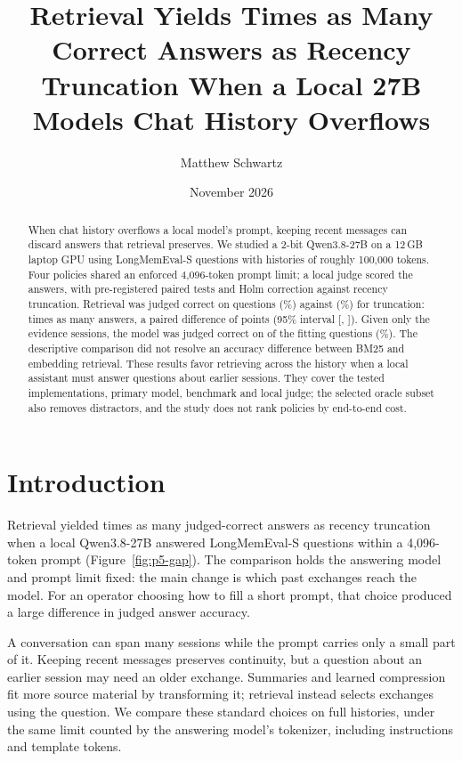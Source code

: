 \documentclass[11pt,letterpaper]{article}
\title{\textbf{Retrieval Yields \PfiveRetrievalRatio{} Times as Many Correct Answers as Recency Truncation When a Local 27B Model\textquotesingle{}s Chat History Overflows}}
\author{Matthew Schwartz\singleauthorinfo{Independent researcher \enspace
\href{https://orcid.org/0009-0009-4171-7247}{ORCID 0009-0009-4171-7247}
\enspace \texttt{matthew.schwartz.research@gmail.com}}}
\date{November 2026}
\newcommand{\PfiveLargeBudget}{4,096}
\newcommand{\PfiveHistoryTokens}{100,000}
\newcommand{\PfiveGpuMemory}{12}
\newcommand{\PfiveBits}{2}
\newcommand{\PfiveConfidence}{95}
\begin{document}
\maketitle

\begin{abstract}
\noindent
When chat history overflows a local model's prompt, keeping recent messages can
discard answers that retrieval preserves. We studied a \PfiveBits{}-bit
Qwen3.8-27B on a \PfiveGpuMemory{}\,GB laptop GPU using \PfNMFour{}
LongMemEval-S questions with histories of roughly \PfiveHistoryTokens{} tokens.
Four policies shared an enforced \PfiveLargeBudget{}-token prompt limit; a local
judge scored the answers, with pre-registered paired tests and Holm correction
against recency truncation. Retrieval was judged correct on \PfCorrectMFour{}
questions (\PfAccMFour\%) against \PfCorrectTFour{} (\PfAccTFour\%) for
truncation: \PfiveRetrievalRatio{} times as many answers, a paired difference of
\PfDiffMvT{} points (\PfiveConfidence\% interval
[\PfDiffLoMvT, \PfDiffHiMvT]). Given only the evidence sessions, the model
was judged correct on \PfCorrectOFour{} of the \PfNOFour{} fitting questions
(\PfAccOFour\%). The descriptive comparison did not resolve
an accuracy difference between BM25 and embedding retrieval. These
results favor retrieving across the history when a local assistant must answer
questions about earlier sessions. They cover the tested implementations,
primary model, benchmark and local judge; the selected oracle subset also
removes distractors, and the study does not rank policies by end-to-end cost.
\end{abstract}

\section{Introduction}
\label{sec:intro}
Retrieval yielded \PfiveRetrievalRatio{} times as many judged-correct answers
as recency truncation when a local Qwen3.8-27B answered LongMemEval-S questions
within a \PfiveLargeBudget{}-token prompt (Figure~\ref{fig:p5-gap}). The
comparison holds the answering model and prompt limit fixed: the main change
is which past exchanges reach the model. For an operator choosing how to fill
a short prompt, that choice produced a large difference in judged answer accuracy.

A conversation can span many sessions while the prompt carries only a small
part of it. Keeping recent messages preserves continuity, but a question about
an earlier session may need an older exchange. Summaries and learned
compression fit more source material by transforming it; retrieval instead
selects exchanges using the question. We compare these standard choices on
full histories, under the same limit counted by the answering model's
tokenizer, including instructions and template tokens.
\end{document}

